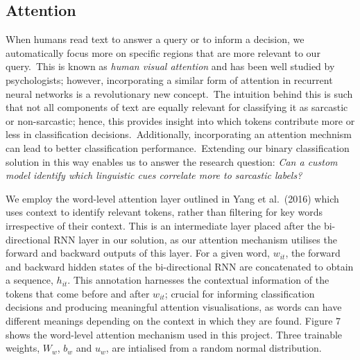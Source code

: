 \documentclass[12pt,a4paper]{article}
\begin{document}

\subsection{Attention}
\vspace{-4.2pt}
\noindent When humans read text to answer a query or to inform a decision, we automatically focus more on specific regions that are more relevant to our query.\ This is known as \textit{human visual attention} and has been well studied by psychologists; however, incorporating a similar form of attention in recurrent neural networks is a revolutionary new concept.\ The intuition behind this is such that not all components of text are equally relevant for classifying it as sarcastic or non-sarcastic; hence, this provides insight into which tokens contribute more or less in classification decisions.\ Additionally, incorporating an attention mechnism can lead to better classification performance.\ Extending our binary classification solution in this way enables us to answer the research question: \textit{Can a custom model identify which linguistic cues correlate more to sarcastic labels?}\\\vspace{-5pt}

\noindent We employ the word-level attention layer outlined in Yang et al.\ (2016) \cite{yang2016hierarchical} which uses context to identify relevant tokens, rather than filtering for key words irrespective of their context. This is an intermediate layer placed after the bi-directional RNN layer in our solution, as our attention mechanism utilises the forward and backward outputs of this layer. For a given word, $w_{it}$, the forward and backward hidden states of the bi-directional RNN are concatenated to obtain a sequence, $h_{it}$. This annotation harnesses the contextual information of the tokens that come before and after $w_{it}$; crucial for informing classification decisions and producing meaningful attention visualisations, as words can have different meanings depending on the context in which they are found. Figure 7 shows the word-level attention mechanism used in this project. Three trainable weights, $W_w$, $b_w$ and $u_w$, are intialised from a random normal distribution.\\\vspace{-10pt}
\end{document}
